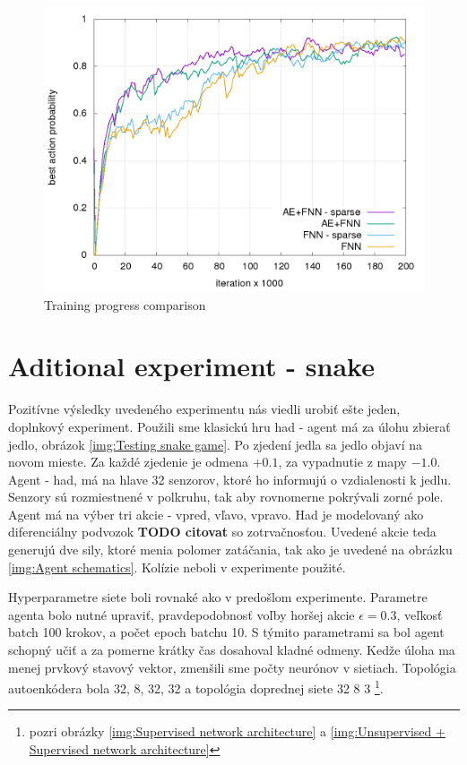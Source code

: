 \documentclass[10pt,a4paper]{article}
\begin{document}
\begin{figure}[!h]
  \centering
  \includegraphics[scale=0.4]{../../results/rl_arcade/training_progress.png}
  \caption{Training progress comparison}
  \label{img:Training progress comparison}
\end{figure}



\newpage
\section{Aditional experiment - snake}

Pozitívne výsledky uvedeného experimentu nás viedli urobiť ešte jeden, doplnkový experiment.
Použili sme klasickú hru had - agent má za úlohu zbierať jedlo, obrázok \ref{img:Testing snake game}.
Po zjedení jedla sa jedlo objaví na novom mieste. Za každé zjedenie je odmena $+0.1$, za vypadnutie z mapy $-1.0$. Agent - had, má na
hlave 32 senzorov, ktoré ho informujú o vzdialenosti k jedlu. Senzory sú rozmiestnené
v polkruhu, tak aby rovnomerne pokrývali zorné pole.
Agent má na výber tri akcie - vpred, vľavo, vpravo. Had je modelovaný ako diferenciálny
podvozok {\bf TODO citovat} so zotrvačnosťou. Uvedené akcie teda generujú dve sily, ktoré
menia polomer zatáčania, tak ako je uvedené na obrázku \ref{img:Agent schematics}.
Kolízie neboli v experimente použité.
 
Hyperparametre siete boli rovnaké ako v predošlom experimente.
Parametre agenta bolo nutné upraviť, pravdepodobnosť voľby horšej akcie $\epsilon = 0.3$,
veľkosť batch 100 krokov, a počet epoch batchu 10. S týmito parametrami sa bol agent schopný
učiť a za pomerne krátky čas dosahoval kladné odmeny.
Kedže úloha ma menej prvkový stavový vektor, zmenšili sme počty neurónov v sietiach.
Topológia autoenkódera bola 32, 8, 32, 32 a topológia doprednej siete
32 8 3 \footnote {pozri obrázky \ref{img:Supervised network architecture} a \ref{img:Unsupervised + Supervised network architecture}}.
\end{document}
